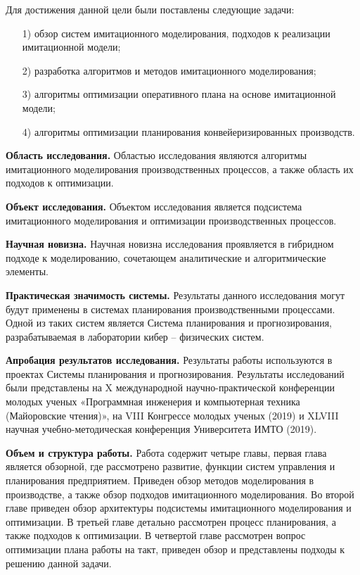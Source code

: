 Для достижения данной цели были поставлены следующие задачи:

\begin{enumerate}
    \item [1)] обзор систем имитационного моделирования, подходов к реализации имитационной модели;
    \item [2)] разработка алгоритмов и методов имитационного моделирования;
    \item [3)] алгоритмы оптимизации оперативного плана на основе имитационной модели;
    \item [4)] алгоритмы оптимизации планирования конвейеризированных производств.
\end{enumerate}

\textbf{Область исследования.} Областью исследования являются алгоритмы имитационного моделирования производственных процессов, а также область их подходов к оптимизации.

\textbf{Объект исследования.} Объектом исследования является подсистема имитационного моделирования и оптимизации производственных процессов.

\textbf{Научная новизна.} Научная новизна исследования проявляется в гибридном подходе к моделированию, сочетающем аналитические и алгоритмические элементы.

\textbf{Практическая значимость системы.} Результаты данного исследования могут будут применены в системах планирования производственными процессами. Одной из таких систем является Система планирования и прогнозирования, разрабатываемая в лаборатории кибер – физических систем.

\textbf{Апробация результатов исследования.} Результаты работы используются в проектах Системы планирования и прогнозирования. Результаты исследований были представлены на X международной научно-практической конференции молодых ученых «Программная инженерия и компьютерная техника (Майоровские чтения)», на VIII Конгрессе молодых ученых (2019) и XLVIII научная учебно-методическая конференция Университета ИМТО (2019).

\textbf{Объем и структура работы.} Работа содержит четыре главы, первая глава является обзорной, где рассмотрено развитие, функции систем управления и планирования предприятием. Приведен обзор методов моделирования в производстве, а также обзор подходов имитационного моделирования. Во второй главе приведен обзор архитектуры подсистемы имитационного моделирования и оптимизации. В третьей главе детально рассмотрен процесс планирования, а также подходов к оптимизации. В четвертой главе рассмотрен вопрос оптимизации плана работы на такт, приведен обзор и представлены подходы к решению данной задачи.

